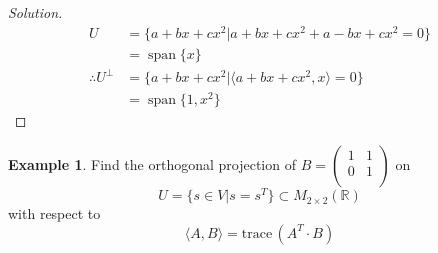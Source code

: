 \documentclass[fleqn, a4paper, 12pt]{article}
\newcommand{\trace}{\mathrm{trace\,}}
\theoremstyle{definition}
\newtheorem{example}{Example}
\theoremstyle{theorem}
\newenvironment{solution}
{\begin{proof}[Solution]\let\qed\relax}
	{\end{proof}}
\DeclareMathOperator{\vspan}{\mathrm{span}} %
\begin{document}
\begin{solution}
	\begin{align*}
		U &= \{a + bx + cx^2 | a + bx + cx^2 + a - bx + cx^2 = 0\}\\
		&= \vspan\{x\}\\
		\therefore U^{\perp} &= \{a + bx + cx^2 | \langle a + bx + cx^2, x \rangle = 0\}\\
		&= \vspan\{1, x^2\}
	\end{align*}
\end{solution}

\begin{example}
	Find the orthogonal projection of
	$
		B = 
		\begin{pmatrix}
			1 & 1\\
			0 & 1\\
		\end{pmatrix}
	$
	on
	\begin{equation*}
		U = \{s \in V | s = s^T\} \subset M_{2 \times 2}(\mathbb{R})
	\end{equation*}
	with respect to
	\begin{equation*}
		\langle A, B \rangle = \trace \left( A^T \cdot B \right)
	\end{equation*}
\end{example}
\end{document}
